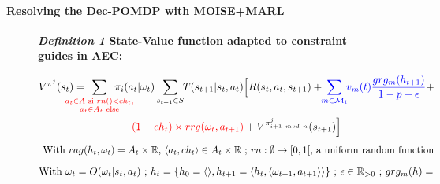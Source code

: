 \documentclass[pdflatex,sn-mathphys-num]{sn-jnl}%
\theoremstyle{thmstyleone}%
\theoremstyle{thmstyletwo}%
\theoremstyle{thmstylethree}%
\begin{document}
\paragraph{\textbf{Resolving the Dec-POMDP with MOISE+MARL}}

\begin{figure}[h]
    \label{eq:single_value_function}
    \raggedright
    \textbf{\textit{Definition 1} \quad State-Value function adapted to constraint guides in AEC:}
    
    \begin{scriptsize}
        \vspace{-0.6cm}
        \begin{gather*}
            V^{\pi^j}(s_t) = \hspace{-0.75cm}
            \sum_{\textcolor{red}{ \substack{a_{t} \in A \text{ si } rn() < ch_{t}, \\
                        a_{t} \in A_{t} \text{ else}}
                }}{\hspace{-0.7cm} \pi_i(a_{t} | \omega_t)}
            \sum_{s_{t+1} \in S}
            {\hspace{-0.1cm} T(s_{t+1} | s_t, a_{t})
            \Bigl[R(s_t,a_{t},s_{t+1}) + \hspace{-0.1cm}
            \textcolor{blue}{ \sum_{m \in \mathcal{M}_i}{ \hspace{-0.1cm} v_m(t) \frac{grg_m(h_{t+1})}{1 - p + \epsilon} } }
            + } \\
            {\textcolor{red}{(1-ch_t) \times rrg(\omega_t,a_{t+1})} + V^{\pi^j_{i+1 \ mod \ n}}(s_{t+1})\Bigr]}
        \end{gather*}
        \vspace{-0.5cm}
        \textcolor{red}{\[\text{ \hspace{-0.1cm} With } rag(h_t, \omega_t) = A_{t} \times \mathbb{R} \text{, } \langle a_t, ch_{t} \rangle \in A_{t} \times \mathbb{R} \text{ ; } rn: \emptyset \to [0,1[ \text{, a uniform random function}\]}
        \vspace{-0.6cm}
        \textcolor{blue}{
            \begin{gather*}
                \hspace{-0.001cm}
                \text{With } \omega_t = O(\omega_t | s_t, a_t) \text{ ; } h_t = \{h_0 = \langle \rangle, h_{t+1} = \langle h_t, \langle \omega_{t+1}, a_{t+1} \rangle \rangle \} \text{ ; } \epsilon \in \mathbb{R}_{>0} \text{ ; } grg_m(h) = 
            \end{gather*}
}
\end{scriptsize}
\end{figure}
\end{document}
